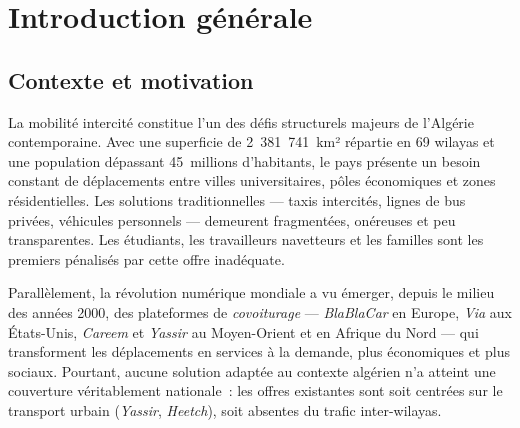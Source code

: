 \documentclass[12pt, a4paper, oneside]{report}
\begin{document}



\setcounter{page}{1}

\tableofcontents
\newpage

\listoffigures
{}
\newpage

\listoftables
{}
\newpage




\chapter*{Introduction générale}

\section*{Contexte et motivation}

La mobilité intercité constitue l'un des défis structurels majeurs de l'Algérie contemporaine. Avec une superficie de 2~381~741~km² répartie en 69 wilayas et une population dépassant 45~millions d'habitants, le pays présente un besoin constant de déplacements entre villes universitaires, pôles économiques et zones résidentielles. Les solutions traditionnelles --- taxis intercités, lignes de bus privées, véhicules personnels --- demeurent fragmentées, onéreuses et peu transparentes. Les étudiants, les travailleurs navetteurs et les familles sont les premiers pénalisés par cette offre inadéquate.

Parallèlement, la révolution numérique mondiale a vu émerger, depuis le milieu des années 2000, des plateformes de \textit{covoiturage} --- \textit{BlaBlaCar} en Europe, \textit{Via} aux États-Unis, \textit{Careem} et \textit{Yassir} au Moyen-Orient et en Afrique du Nord --- qui transforment les déplacements en services à la demande, plus économiques et plus sociaux. Pourtant, aucune solution adaptée au contexte algérien n'a atteint une couverture véritablement nationale~: les offres existantes sont soit centrées sur le transport urbain (\textit{Yassir}, \textit{Heetch}), soit absentes du trafic inter-wilayas.
\end{document}
